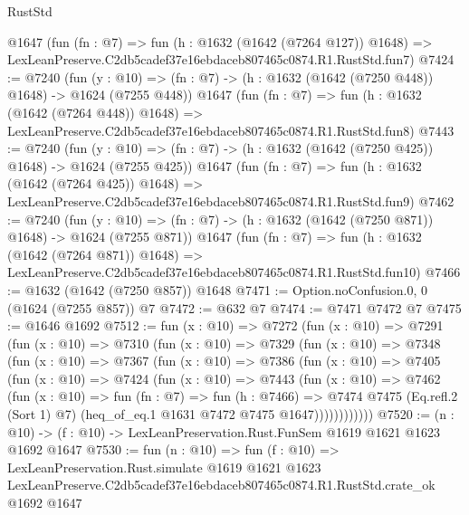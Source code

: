 \begin{lexlean}{RustStd}
\begin{coremodule}
    @1647
    (fun (fn : @7) =>
    fun (h : @1632 (@1642 (@7264 @127)) @1648) =>
    LexLeanPreserve.C2db5cadef37e16ebdaceb807465c0874.R1.RustStd.fun7)
@7424 := @7240
    (fun (y : @10) => (fn : @7) -> (h : @1632 (@1642 (@7250 @448)) @1648) -> @1624 (@7255 @448))
    @1647
    (fun (fn : @7) =>
    fun (h : @1632 (@1642 (@7264 @448)) @1648) =>
    LexLeanPreserve.C2db5cadef37e16ebdaceb807465c0874.R1.RustStd.fun8)
@7443 := @7240
    (fun (y : @10) => (fn : @7) -> (h : @1632 (@1642 (@7250 @425)) @1648) -> @1624 (@7255 @425))
    @1647
    (fun (fn : @7) =>
    fun (h : @1632 (@1642 (@7264 @425)) @1648) =>
    LexLeanPreserve.C2db5cadef37e16ebdaceb807465c0874.R1.RustStd.fun9)
@7462 := @7240
    (fun (y : @10) => (fn : @7) -> (h : @1632 (@1642 (@7250 @871)) @1648) -> @1624 (@7255 @871))
    @1647
    (fun (fn : @7) =>
    fun (h : @1632 (@1642 (@7264 @871)) @1648) =>
    LexLeanPreserve.C2db5cadef37e16ebdaceb807465c0874.R1.RustStd.fun10)
@7466 := @1632 (@1642 (@7250 @857)) @1648
@7471 := Option.noConfusion.{0, 0} (@1624 (@7255 @857)) @7
@7472 := @632 @7
@7474 := @7471 @7472 @7
@7475 := @1646 @1692
@7512 := fun (x : @10) =>
  @7272
    (fun (x : @10) =>
    @7291
      (fun (x : @10) =>
      @7310
        (fun (x : @10) =>
        @7329
          (fun (x : @10) =>
          @7348
            (fun (x : @10) =>
            @7367
              (fun (x : @10) =>
              @7386
                (fun (x : @10) =>
                @7405
                  (fun (x : @10) =>
                  @7424
                    (fun (x : @10) =>
                    @7443
                      (fun (x : @10) =>
                      @7462
                        (fun (x : @10) =>
                        fun (fn : @7) =>
                        fun (h : @7466) =>
                        @7474
                          @7475
                          (Eq.refl.{2} (Sort 1) @7)
                          (heq_of_eq.{1} @1631 @7472 @7475 @1647))))))))))))
@7520 := (n : @10) -> (f : @10) -> LexLeanPreservation.Rust.FunSem @1619 @1621 @1623 @1692 @1647
@7530 := fun (n : @10) =>
  fun (f : @10) =>
  LexLeanPreservation.Rust.simulate
    @1619
    @1621
    @1623
    LexLeanPreserve.C2db5cadef37e16ebdaceb807465c0874.R1.RustStd.crate_ok
    @1692
    @1647
\end{coremodule}
\end{lexlean}
